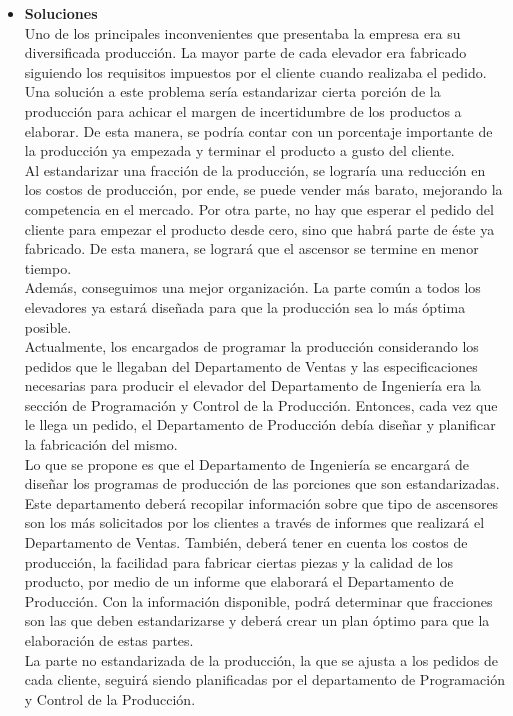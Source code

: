 \documentclass[a4paper,10pt,titlepage]{article}
\begin{document}
\begin{itemize}
 \item \textbf{Soluciones}\\
Uno de los principales inconvenientes que presentaba la empresa era su diversificada producci\'on. La  mayor parte de cada elevador era fabricado siguiendo los requisitos impuestos por el cliente cuando realizaba el pedido. Una soluci\'on a este problema ser\'ia estandarizar cierta porci\'on de la producci\'on para achicar el margen de incertidumbre de los productos a elaborar. De esta manera, se podr\'ia contar con un porcentaje importante de la producci\'on ya empezada y terminar el producto a gusto del cliente. \\
Al estandarizar una fracci\'on de la producci\'on, se lograr\'ia una reducci\'on en los costos de producci\'on, por ende, se puede vender m\'as barato, mejorando la competencia en el mercado. Por otra parte, no hay que esperar el pedido del cliente para empezar el producto desde cero, sino que habr\'a parte de \'este ya fabricado. De esta manera, se lograr\'a que el ascensor se termine en menor tiempo. \\
Adem\'as, conseguimos una mejor organizaci\'on. La parte com\'un a todos los elevadores ya estar\'a diseñada para que la producci\'on sea lo m\'as \'optima posible. \\
Actualmente, los encargados de programar la producci\'on considerando los pedidos que le llegaban del Departamento de Ventas y las especificaciones necesarias para producir el elevador del Departamento de Ingenier\'ia era la secci\'on de Programaci\'on y Control de la Producci\'on. Entonces, cada vez que le llega un pedido, el Departamento de Producci\'on deb\'ia diseñar y planificar la fabricaci\'on del mismo.\\
Lo que se propone es que el Departamento de Ingenier\'ia se encargar\'a de  diseñar los programas de producci\'on de las porciones que son estandarizadas. Este departamento deber\'a recopilar informaci\'on sobre que tipo de ascensores son los m\'as solicitados por los clientes a trav\'es de informes que realizar\'a el Departamento de Ventas. Tambi\'en, deber\'a tener en cuenta los costos de producci\'on, la facilidad para fabricar ciertas piezas y la calidad de los producto, por medio de un informe que elaborar\'a el Departamento de Producci\'on. Con la informaci\'on disponible, podr\'a determinar que fracciones son las que deben estandarizarse y deber\'a crear un plan \'optimo para que la elaboraci\'on de estas partes. \\
La parte no estandarizada de la producci\'on, la que se ajusta a los pedidos de cada cliente, seguir\'a siendo planificadas por el departamento de Programaci\'on y Control de la Producci\'on.\\

\end{itemize}
\end{document}
